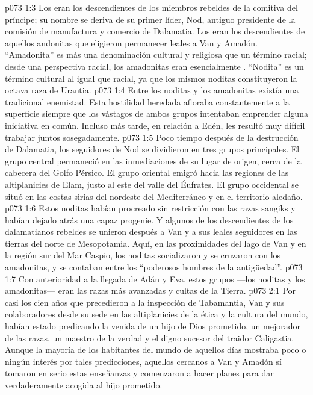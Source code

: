 \vs p073 1:3 Los  eran los descendientes de los miembros rebeldes de la comitiva del príncipe; su nombre se deriva de su primer líder, Nod, antiguo presidente de la comisión de manufactura y comercio de Dalamatia. Los  eran los descendientes de aquellos andonitas que eligieron permanecer leales a Van y Amadón. “Amadonita” es más una denominación cultural y religiosa que un término racial; desde una perspectiva racial, los amadonitas eran esencialmente . “Nodita” es un término cultural al igual que racial, ya que los mismos noditas constituyeron la octava raza de Urantia.
\vs p073 1:4 Entre los noditas y los amadonitas existía una tradicional enemistad. Esta hostilidad heredada afloraba constantemente a la superficie siempre que los vástagos de ambos grupos intentaban emprender alguna iniciativa en común. Incluso más tarde, en relación a Edén, les resultó muy difícil trabajar juntos sosegadamente.
\vs p073 1:5 Poco tiempo después de la destrucción de Dalamatia, los seguidores de Nod se dividieron en tres grupos principales. El grupo central permaneció en las inmediaciones de su lugar de origen, cerca de la cabecera del Golfo Pérsico. El grupo oriental emigró hacia las regiones de las altiplanicies de Elam, justo al este del valle del Éufrates. El grupo occidental se situó en las costas sirias del nordeste del Mediterráneo y en el territorio aledaño.
\vs p073 1:6 Estos noditas habían procreado sin restricción con las razas sangiks y habían dejado atrás una capaz progenie. Y algunos de los descendientes de los dalamatianos rebeldes se unieron después a Van y a sus leales seguidores en las tierras del norte de Mesopotamia. Aquí, en las proximidades del lago de Van y en la región sur del Mar Caspio, los noditas socializaron y se cruzaron con los amadonitas, y se contaban entre los “poderosos hombres de la antigüedad”.
\vs p073 1:7 Con anterioridad a la llegada de Adán y Eva, estos grupos ---los noditas y los amadonitas--- eran las razas más avanzadas y cultas de la Tierra.
\vs p073 2:1 Por casi los cien años que precedieron a la inspección de Tabamantia, Van y sus colaboradores desde su sede en las altiplanicies de la ética y la cultura del mundo, habían estado predicando la venida de un hijo de Dios prometido, un mejorador de las razas, un maestro de la verdad y el digno sucesor del traidor Caligastia. Aunque la mayoría de los habitantes del mundo de aquellos días mostraba poco o ningún interés por tales predicciones, aquellos cercanos a Van y Amadón sí tomaron en serio estas enseñanzas y comenzaron a hacer planes para dar verdaderamente acogida al hijo prometido.
